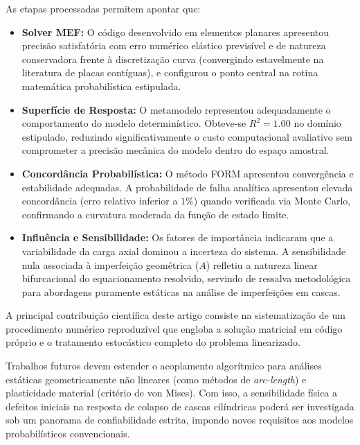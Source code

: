 \documentclass[12pt,a4paper]{article}
\begin{document}
As etapas processadas permitem apontar que:
\begin{itemize}
    \item \textbf{Solver MEF:} O código desenvolvido em elementos planares apresentou precisão satisfatória com erro numérico elástico previsível e de natureza conservadora frente à discretização curva (convergindo estavelmente na literatura de placas contíguas), e configurou o ponto central na rotina matemática probabilística estipulada.
    \item \textbf{Superfície de Resposta:} O metamodelo representou adequadamente o comportamento do modelo determinístico. Obteve-se $R^2 = 1.00$ no domínio estipulado, reduzindo significativamente o custo computacional avaliativo sem comprometer a precisão mecânica do modelo dentro do espaço amostral.
    \item \textbf{Concordância Probabilística:} O método FORM apresentou convergência e estabilidade adequadas. A probabilidade de falha analítica apresentou elevada concordância (erro relativo inferior a $1\%$) quando verificada via Monte Carlo, confirmando a curvatura moderada da função de estado limite.
    \item \textbf{Influência e Sensibilidade:} Os fatores de importância indicaram que a variabilidade da carga axial dominou a incerteza do sistema. A sensibilidade nula associada à imperfeição geométrica ($A$) refletiu a natureza linear bifurcacional do equacionamento resolvido, servindo de ressalva metodológica para abordagens puramente estáticas na análise de imperfeições em cascas.
\end{itemize}

A principal contribuição científica deste artigo consiste na sistematização de um procedimento numérico reproduzível que engloba a solução matricial em código próprio e o tratamento estocástico completo do problema linearizado. 

Trabalhos futuros devem estender o acoplamento algorítmico para análises estáticas geometricamente não lineares (como métodos de \textit{arc-length}) e plasticidade material (critério de von Mises). Com isso, a sensibilidade física a defeitos iniciais na resposta de colapso de cascas cilíndricas poderá ser investigada sob um panorama de confiabilidade estrita, impondo novos requisitos aos modelos probabilísticos convencionais.
\end{document}
